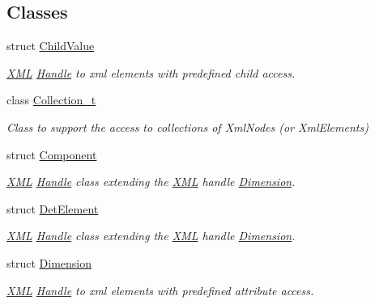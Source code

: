 \subsection*{Classes}
\begin{DoxyCompactItemize}
\item 
struct \hyperlink{struct_d_d4hep_1_1_x_m_l_1_1_child_value}{Child\+Value}
\begin{DoxyCompactList}\small\item\em \hyperlink{namespace_d_d4hep_1_1_x_m_l}{X\+ML} \hyperlink{class_d_d4hep_1_1_handle}{Handle} to xml elements with predefined child access. \end{DoxyCompactList}\item 
class \hyperlink{class_d_d4hep_1_1_x_m_l_1_1_collection__t}{Collection\+\_\+t}
\begin{DoxyCompactList}\small\item\em Class to support the access to collections of Xml\+Nodes (or Xml\+Elements) \end{DoxyCompactList}\item 
struct \hyperlink{struct_d_d4hep_1_1_x_m_l_1_1_component}{Component}
\begin{DoxyCompactList}\small\item\em \hyperlink{namespace_d_d4hep_1_1_x_m_l}{X\+ML} \hyperlink{class_d_d4hep_1_1_handle}{Handle} class extending the \hyperlink{namespace_d_d4hep_1_1_x_m_l}{X\+ML} handle \hyperlink{struct_d_d4hep_1_1_x_m_l_1_1_dimension}{Dimension}. \end{DoxyCompactList}\item 
struct \hyperlink{struct_d_d4hep_1_1_x_m_l_1_1_det_element}{Det\+Element}
\begin{DoxyCompactList}\small\item\em \hyperlink{namespace_d_d4hep_1_1_x_m_l}{X\+ML} \hyperlink{class_d_d4hep_1_1_handle}{Handle} class extending the \hyperlink{namespace_d_d4hep_1_1_x_m_l}{X\+ML} handle \hyperlink{struct_d_d4hep_1_1_x_m_l_1_1_dimension}{Dimension}. \end{DoxyCompactList}\item 
struct \hyperlink{struct_d_d4hep_1_1_x_m_l_1_1_dimension}{Dimension}
\begin{DoxyCompactList}\small\item\em \hyperlink{namespace_d_d4hep_1_1_x_m_l}{X\+ML} \hyperlink{class_d_d4hep_1_1_handle}{Handle} to xml elements with predefined attribute access. \end{DoxyCompactList}\item 

\end{DoxyCompactItemize}
